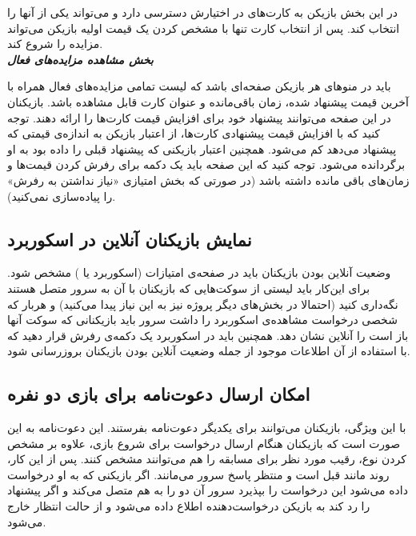 \documentclass[]{article}
\begin{document}
در این بخش بازیکن به کارت‌های در اختیارش دسترسی دارد و می‌تواند یکی از آنها را انتخاب کند. پس از انتخاب کارت تنها با مشخص کردن یک قیمت اولیه بازیکن می‌تواند مزایده را شروع کند.
\\

\textbf{\emph{ بخش مشاهده مزایده‌های فعال }}

باید در منو‌های هر بازیکن صفحه‌ای باشد که لیست تمامی مزایده‌های فعال همراه با آخرین قیمت پیشنهاد شده، زمان باقی‌مانده و عنوان کارت قابل مشاهده باشد. بازیکنان در این صفحه می‌توانند پیشنهاد خود برای افزایش قیمت کارت‌ها را ارائه دهند. توجه کنید که با افزایش قیمت پیشنهادی کارت‌ها، از اعتبار بازیکن به اندازه‌ی قیمتی که پیشنهاد می‌دهد کم می‌شود. همچنین اعتبار بازیکنی که پیشنهاد قبلی را داده بود به او برگردانده می‌شود. توجه کنید که این صفحه باید یک دکمه برای رفرش کردن قیمت‌ها و زمان‌های باقی مانده داشته باشد (در صورتی که بخش امتیازی «نیاز نداشتن به رفرش» را پیاده‌سازی نمی‌کنید).

\subsection*{{\titr نمایش بازیکنان آنلاین در اسکوربرد}}

وضعیت آنلاین بودن بازیکنان باید در صفحه‌ی امتیازات (اسکوربرد یا ) مشخص شود. برای این‌کار باید لیستی از سوکت‌هایی که بازیکنان با آن به سرور متصل هستند نگه‌داری کنید (احتمالا در بخش‌های دیگر پروژه نیز به این نیاز پیدا می‌کنید) و هربار که شخصی درخواست مشاهده‌ی اسکوربرد را داشت سرور باید بازیکنانی که سوکت‌ آنها باز است را آنلاین نشان دهد. همچنین باید در اسکوربرد یک دکمه‌ی رفرش قرار دهید که با استفاده از آن اطلاعات موجود از جمله وضعیت آنلاین بودن بازیکنان بروزرسانی شود.

\subsection*{{\titr امکان ارسال دعوت‌نامه برای بازی دو نفره}}

با این ویژگی، بازیکنان می‌توانند برای یکدیگر دعوت‌نامه بفرستند. این دعوت‌نامه به این صورت است که بازیکنان هنگام ارسال درخواست برای شروع بازی، علاوه بر مشخص کردن نوع، رقیب مورد نظر برای مسابقه را هم می‌توانند مشخص کنند. پس از این کار، روند مانند قبل است و منتظر پاسخ سرور می‌مانند. اگر بازیکنی که به او درخواست داده می‌شود این درخواست را بپذیرد سرور آن دو را به هم متصل می‌کند و اگر پیشنهاد را رد کند به بازیکن درخواست‌دهنده اطلاع داده می‌شود و از حالت انتظار خارج می‌شود.
\end{document}

